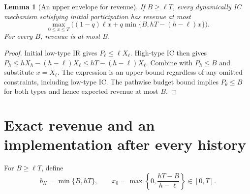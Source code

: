 \documentclass[11pt]{article}
\newtheorem{lemma}[theorem]{Lemma}
\theoremstyle{remark}
\begin{document}
\begin{lemma}[An upper envelope for revenue]\label{envelope}
If $B\geq\ell T$, every dynamically IC mechanism satisfying initial
participation has revenue at most
\[
 \max_{0\leq x\leq T}
 \bigl((1-q)\ell x+q\min\{B,hT-(h-\ell)x\}\bigr).
\]
For every $B$, revenue is at most $B$.
\end{lemma}
\begin{proof}
Initial low-type IR gives $P_\ell\leq\ell X_\ell$. High-type IC then
gives $P_h\leq hX_h-(h-\ell)X_\ell\leq hT-(h-\ell)X_\ell$.
Combine with $P_h\leq B$ and substitute $x=X_\ell$. The expression
is an upper bound regardless of any omitted constraints, including
low-type IC. The pathwise budget bound implies $P_\theta\leq B$ for
both types and hence expected revenue at most $B$.
\end{proof}

\section{Exact revenue and an implementation after every history}
For $B\geq\ell T$, define
\[
 b_H=\min\{B,hT\},\qquad
 x_0=\max\left\{0,\frac{hT-B}{h-\ell}\right\}\in[0,T].
\]
\end{document}

